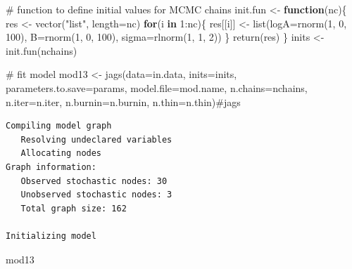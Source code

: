 \documentclass[
  13,
  letterpaper,
]{report}
\newenvironment{Shaded}{\begin{snugshade}}{\end{snugshade}}
\newcommand{\AttributeTok}[1]{\textcolor[rgb]{0.40,0.45,0.13}{#1}}
\newcommand{\CommentTok}[1]{\textcolor[rgb]{0.37,0.37,0.37}{#1}}
\newcommand{\ControlFlowTok}[1]{\textcolor[rgb]{0.00,0.23,0.31}{\textbf{#1}}}
\newcommand{\DecValTok}[1]{\textcolor[rgb]{0.68,0.00,0.00}{#1}}
\newcommand{\FunctionTok}[1]{\textcolor[rgb]{0.28,0.35,0.67}{#1}}
\newcommand{\NormalTok}[1]{\textcolor[rgb]{0.00,0.23,0.31}{#1}}
\newcommand{\OtherTok}[1]{\textcolor[rgb]{0.00,0.23,0.31}{#1}}
\newcommand{\SpecialCharTok}[1]{\textcolor[rgb]{0.37,0.37,0.37}{#1}}
\newcommand{\StringTok}[1]{\textcolor[rgb]{0.13,0.47,0.30}{#1}}
\begin{document}
\begin{Shaded}
\begin{Highlighting}[]
\CommentTok{\# function to define initial values for MCMC chains}
\NormalTok{init.fun }\OtherTok{\textless{}{-}} \ControlFlowTok{function}\NormalTok{(nc)\{}
\NormalTok{    res }\OtherTok{\textless{}{-}} \FunctionTok{vector}\NormalTok{(}\StringTok{"list"}\NormalTok{, }\AttributeTok{length=}\NormalTok{nc)}
    \ControlFlowTok{for}\NormalTok{(i }\ControlFlowTok{in} \DecValTok{1}\SpecialCharTok{:}\NormalTok{nc)\{}
\NormalTok{        res[[i]] }\OtherTok{\textless{}{-}} \FunctionTok{list}\NormalTok{(}\AttributeTok{logA=}\FunctionTok{rnorm}\NormalTok{(}\DecValTok{1}\NormalTok{, }\DecValTok{0}\NormalTok{, }\DecValTok{100}\NormalTok{),}
                         \AttributeTok{B=}\FunctionTok{rnorm}\NormalTok{(}\DecValTok{1}\NormalTok{, }\DecValTok{0}\NormalTok{, }\DecValTok{100}\NormalTok{),}
                         \AttributeTok{sigma=}\FunctionTok{rlnorm}\NormalTok{(}\DecValTok{1}\NormalTok{, }\DecValTok{1}\NormalTok{, }\DecValTok{2}\NormalTok{))}
\NormalTok{    \}}
    \FunctionTok{return}\NormalTok{(res)}
\NormalTok{\}}
\NormalTok{inits }\OtherTok{\textless{}{-}} \FunctionTok{init.fun}\NormalTok{(nchains)}

\CommentTok{\# fit model}
\NormalTok{mod13 }\OtherTok{\textless{}{-}} \FunctionTok{jags}\NormalTok{(}\AttributeTok{data=}\NormalTok{in.data, }\AttributeTok{inits=}\NormalTok{inits,}
              \AttributeTok{parameters.to.save=}\NormalTok{params,}
              \AttributeTok{model.file=}\NormalTok{mod.name,}
              \AttributeTok{n.chains=}\NormalTok{nchains, }\AttributeTok{n.iter=}\NormalTok{n.iter,}
              \AttributeTok{n.burnin=}\NormalTok{n.burnin, }\AttributeTok{n.thin=}\NormalTok{n.thin)}\CommentTok{\#jags}
\end{Highlighting}
\end{Shaded}

\begin{verbatim}
Compiling model graph
   Resolving undeclared variables
   Allocating nodes
Graph information:
   Observed stochastic nodes: 30
   Unobserved stochastic nodes: 3
   Total graph size: 162

Initializing model
\end{verbatim}

\begin{Shaded}
\begin{Highlighting}[]
\NormalTok{mod13}
\end{Highlighting}
\end{Shaded}
\end{document}
